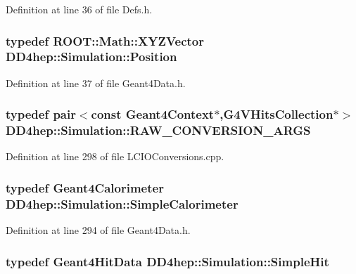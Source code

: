 Definition at line 36 of file Defs.h.\hypertarget{namespace_d_d4hep_1_1_simulation_ad6fd94b3439e31d1ba4b2e640d578558}{
\subsubsection[{Position}]{\setlength{\rightskip}{0pt plus 5cm}typedef ROOT::Math::XYZVector {\bf DD4hep::Simulation::Position}}}
\label{namespace_d_d4hep_1_1_simulation_ad6fd94b3439e31d1ba4b2e640d578558}


Definition at line 37 of file Geant4Data.h.\hypertarget{namespace_d_d4hep_1_1_simulation_a9202b8807ca8dc9a21546a337d2fbc83}{
\subsubsection[{RAW\_\-CONVERSION\_\-ARGS}]{\setlength{\rightskip}{0pt plus 5cm}typedef {\bf pair}$<$const {\bf Geant4Context}$\ast$,{\bf G4VHitsCollection}$\ast$$>$ {\bf DD4hep::Simulation::RAW\_\-CONVERSION\_\-ARGS}}}
\label{namespace_d_d4hep_1_1_simulation_a9202b8807ca8dc9a21546a337d2fbc83}


Definition at line 298 of file LCIOConversions.cpp.\hypertarget{namespace_d_d4hep_1_1_simulation_a05940f87d83b165713f6c92d7cd9425f}{
\subsubsection[{SimpleCalorimeter}]{\setlength{\rightskip}{0pt plus 5cm}typedef {\bf Geant4Calorimeter} {\bf DD4hep::Simulation::SimpleCalorimeter}}}
\label{namespace_d_d4hep_1_1_simulation_a05940f87d83b165713f6c92d7cd9425f}


Definition at line 294 of file Geant4Data.h.\hypertarget{namespace_d_d4hep_1_1_simulation_a0a561b07f32c81b4365bdc61e74e645b}{
\subsubsection[{SimpleHit}]{\setlength{\rightskip}{0pt plus 5cm}typedef {\bf Geant4HitData} {\bf DD4hep::Simulation::SimpleHit}}}
\label{namespace_d_d4hep_1_1_simulation_a0a561b07f32c81b4365bdc61e74e645b}


